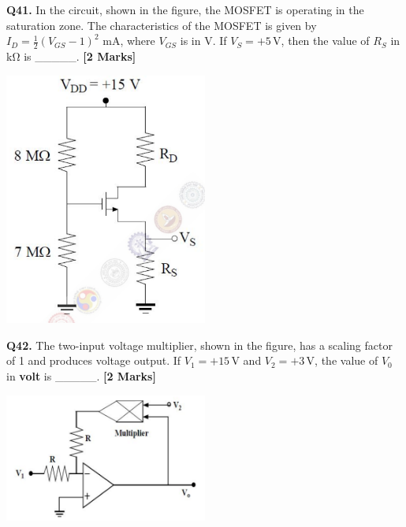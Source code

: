 \documentclass[11pt]{article}
\newcommand{\questionb}[2]{
    \noindent\textbf{Q#2.} #1 \hfill \textbf{[2 Marks]}
}
\begin{document}
\questionb{In the circuit, shown in the figure, the MOSFET is operating in the saturation zone. The characteristics of the MOSFET is given by \( I_D = \frac{1}{2} (V_{GS} - 1)^2 \) mA, where \( V_{GS} \) is in V. If \( V_S = +5 \, \text{V} \), then the value of \( R_S \) in kΩ is \_\_\_\_\_.}{41}
\begin{center}
\includegraphics[width=0.5\textwidth]{figures/41.png}
\end{center}
\vspace{0.5cm}

\questionb{The two-input voltage multiplier, shown in the figure, has a scaling factor of 1 and produces voltage output. If \( V_1 = +15 \, \text{V} \) and \( V_2 = +3 \, \text{V} \), the value of \( V_0 \) in \textbf{volt} is \_\_\_\_\_.}{42}
\begin{center}
\includegraphics[width=0.5\textwidth]{figures/42.png}
\end{center}
\vspace{0.5cm}
\end{document}
